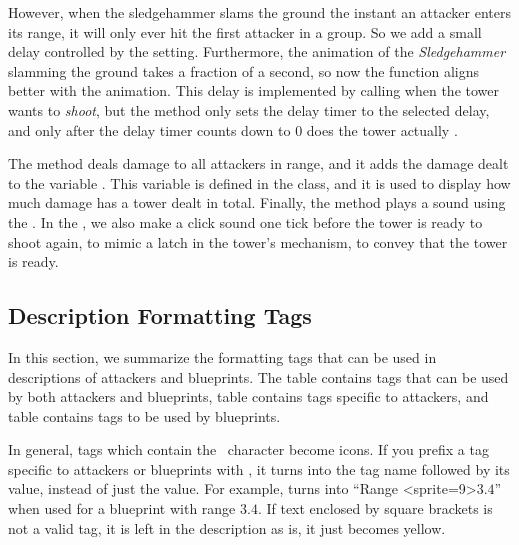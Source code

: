 However, when the sledgehammer slams the ground the instant an attacker enters its range, it will only ever hit the first attacker in a group.
So we add a small delay controlled by the  setting.
Furthermore, the animation of the \emph{Sledgehammer} slamming the ground takes a fraction of a second, so now the function aligns better with the animation.
This delay is implemented by calling  when the tower wants to \emph{shoot}, but the method only sets the delay timer to the selected delay, and only after the delay timer counts down to 0 does the tower actually .

The method  deals damage to all attackers in range, and it adds the damage dealt to the variable .
This variable is defined in the  class, and it is used to display how much damage has a tower dealt in total.
Finally, the method plays a sound using the .
In the , we also make a click sound one tick before the tower is ready to shoot again, to mimic a latch in the tower's mechanism, to convey that the tower is ready.

\subsection{Description Formatting Tags}

In this section, we summarize the formatting tags that can be used in descriptions of attackers and blueprints.
The table  contains tags that can be used by both attackers and blueprints, table  contains tags specific to attackers, and table  contains tags to be used by blueprints.

In general, tags which contain the \mono{\#}~character become icons.
If you prefix a tag specific to attackers or blueprints with \mono{\$}, it turns into the tag name followed by its value, instead of just the value.
For example, \mono{[\$RNG]} turns into \enquote{Range <sprite=9>$3.4$} when used for a blueprint with range $3.4$.
If text enclosed by square brackets is not a valid tag, it is left in the description as is, it just becomes yellow.

